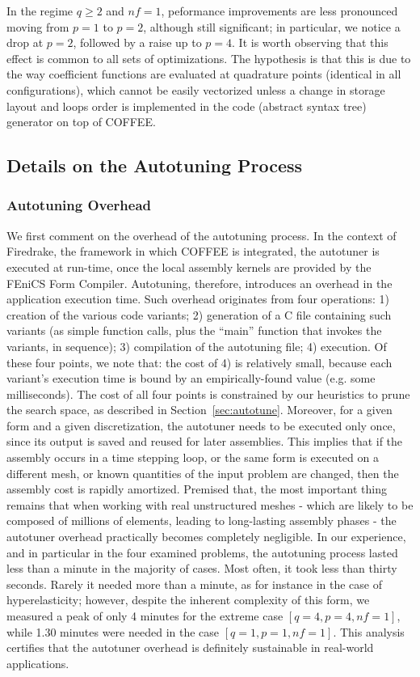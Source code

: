 In the regime $q \geq 2$ and $nf=1$, peformance improvements are less pronounced moving from $p=1$ to $p=2$, although still significant; in particular, we notice a drop at $p=2$, followed by a raise up to $p=4$. It is worth observing that this effect is common to all sets of optimizations. The hypothesis is that this is due to the way coefficient functions are evaluated at quadrature points (identical in all configurations), which cannot be easily vectorized unless a change in storage layout and loops order is implemented in the code (abstract syntax tree) generator on top of COFFEE. 

\subsection{Details on the Autotuning Process}
\label{sec:coffee-pereval-autotune}

\subsubsection{Autotuning Overhead}
We first comment on the overhead of the autotuning process. In the context of Firedrake, the framework in which COFFEE is integrated, the autotuner is executed at run-time, once the local assembly kernels are provided by the FEniCS Form Compiler. Autotuning, therefore, introduces an overhead in the application execution time. Such overhead originates from four operations: 1) creation of the various code variants; 2) generation of a C file containing such variants (as simple function calls, plus the ``main'' function that invokes the variants, in sequence); 3) compilation of the autotuning file; 4) execution. Of these four points, we note that: the cost of 4) is relatively small, because each variant's execution time is bound by an empirically-found value (e.g. some milliseconds). The cost of all four points is constrained by our heuristics to prune the search space, as described in Section~\ref{sec:autotune}. Moreover, for a given form and a given discretization, the autotuner needs to be executed only once, since its output is saved and reused for later assemblies. This implies that if the assembly occurs in a time stepping loop, or the same form is executed on a different mesh, or known quantities of the input problem are changed, then the assembly cost is rapidly amortized. Premised that, the most important thing remains that when working with real unstructured meshes - which are likely to be composed of millions of elements, leading to long-lasting assembly phases - the autotuner overhead practically becomes completely negligible. In our experience, and in particular in the four examined problems, the autotuning process lasted less than a minute in the majority of cases. Most often, it took less than thirty seconds. Rarely it needed more than a minute, as for instance in the case of hyperelasticity; however, despite the inherent complexity of this form, we measured a peak of only 4 minutes for the extreme case $[q=4, p=4, nf=1]$, while 1.30 minutes were needed in the case $[q=1, p=1, nf=1]$. This analysis certifies that the autotuner overhead is definitely sustainable in real-world applications.

